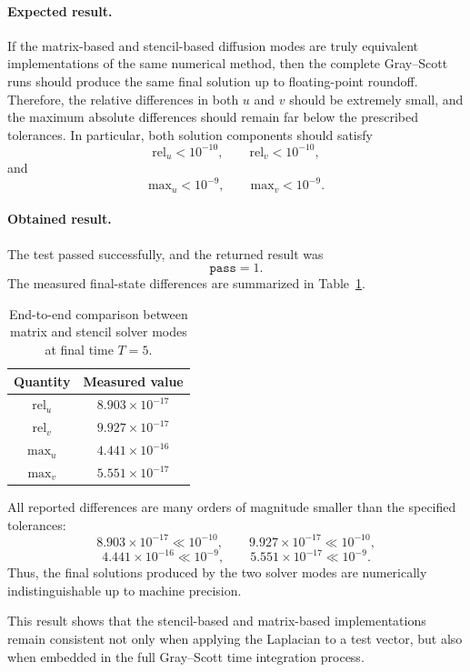 \paragraph{Expected result.}
If the matrix-based and stencil-based diffusion modes are truly equivalent implementations of the same numerical method, then the complete Gray--Scott runs should produce the same final solution up to floating-point roundoff. Therefore, the relative differences in both \(u\) and \(v\) should be extremely small, and the maximum absolute differences should remain far below the prescribed tolerances. In particular, both solution components should satisfy
\[
\mathrm{rel}_u < 10^{-10}, \qquad \mathrm{rel}_v < 10^{-10},
\]
and
\[
\mathrm{max}_u < 10^{-9}, \qquad \mathrm{max}_v < 10^{-9}.
\]

\paragraph{Obtained result.}
The test passed successfully, and the returned result was
\[
\texttt{pass} = 1.
\]
The measured final-state differences are summarized in Table~\ref{tab:matrix_stencil_endtoend_equivalence}.

\begin{table}[htbp]
\centering
\caption{End-to-end comparison between matrix and stencil solver modes at final time \(T=5\).}
\label{tab:matrix_stencil_endtoend_equivalence}
\begin{tabular}{|c|c|}
\hline
Quantity & Measured value \\
\hline
\(\mathrm{rel}_u\) & \(8.903\times 10^{-17}\) \\
\(\mathrm{rel}_v\) & \(9.927\times 10^{-17}\) \\
\(\mathrm{max}_u\) & \(4.441\times 10^{-16}\) \\
\(\mathrm{max}_v\) & \(5.551\times 10^{-17}\) \\
\hline
\end{tabular}
\end{table}

All reported differences are many orders of magnitude smaller than the specified tolerances:
\[
8.903\times 10^{-17} \ll 10^{-10}, \qquad
9.927\times 10^{-17} \ll 10^{-10},
\]
\[
4.441\times 10^{-16} \ll 10^{-9}, \qquad
5.551\times 10^{-17} \ll 10^{-9}.
\]
Thus, the final solutions produced by the two solver modes are numerically indistinguishable up to machine precision.

This result shows that the stencil-based and matrix-based implementations remain consistent not only when applying the Laplacian to a test vector, but also when embedded in the full Gray--Scott time integration process.



